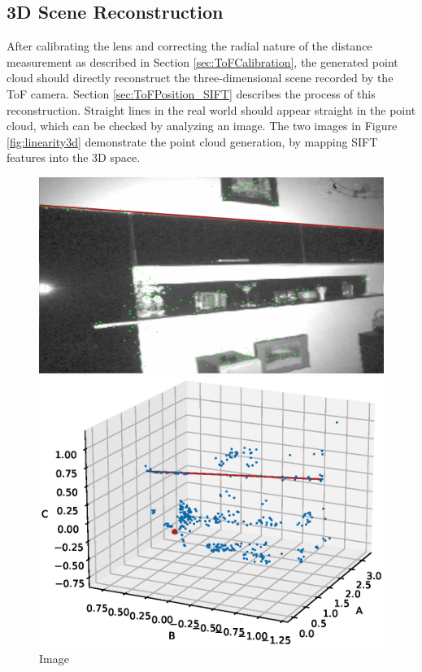 \subsection{3D Scene Reconstruction}
After calibrating the lens and correcting the radial nature of the distance measurement as described in Section \ref{sec:ToFCalibration}, the generated point cloud should directly reconstruct the three-dimensional scene recorded by the ToF camera. Section \ref{sec:ToFPosition_SIFT} describes the process of this reconstruction.
Straight lines in the real world should appear straight in the point cloud, which can be checked by analyzing an image. The two images in Figure \ref{fig:linearity3d} demonstrate the point cloud generation, by mapping SIFT features into the 3D space. 
\begin{figure}[H]
    \centering
    \begin{minipage}[b]{0.45\textwidth}
      \includegraphics[scale=0.105]{images/cloud_3d_linearity_image.png}
      \caption{Image}
      \label{fig:linearity3d_image} 
    \end{minipage} %
    \begin{minipage}[b]{0.45\textwidth}
      \includegraphics[scale=0.45, trim={0cm 0cm 2cm 3.5cm},clip]{images/linearity_3d.eps} 

\end{minipage}
\end{figure}
